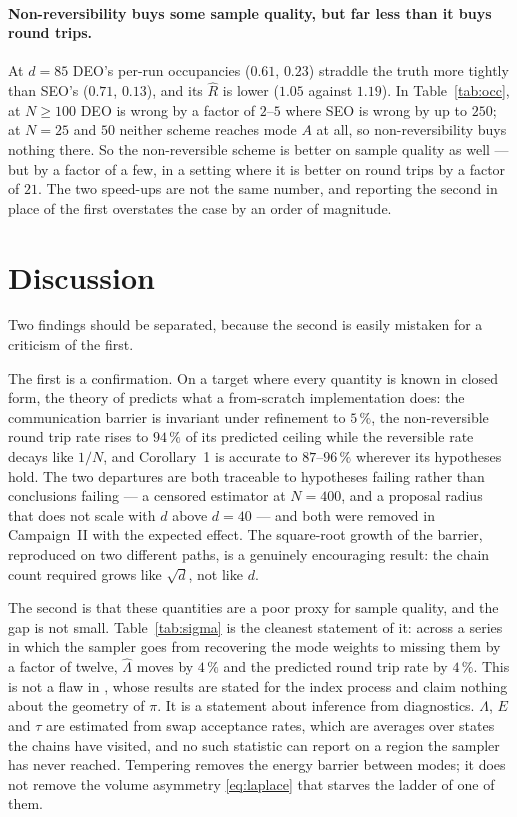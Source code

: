\paragraph{Non-reversibility buys some sample quality, but far less than it buys
round trips.} At $d=85$ DEO's per-run occupancies ($0.61$, $0.23$) straddle the
truth more tightly than SEO's ($0.71$, $0.13$), and its $\hat R$ is lower
($1.05$ against $1.19$). In Table~\ref{tab:occ}, at $N\ge100$ DEO is wrong by a factor of $2$--$5$ where
SEO is wrong by up to $250$; at $N=25$ and $50$ neither scheme reaches mode $A$
at all, so non-reversibility buys nothing there. So the non-reversible scheme is
better on sample quality as well --- but by a factor of a few, in a setting where
it is better on round trips by a factor of $21$. The two speed-ups are not the
same number, and reporting the second in place of the first overstates the case
by an order of magnitude.


\section{Discussion}
\label{sec:discussion}

Two findings should be separated, because the second is easily mistaken for a
criticism of the first.

The first is a confirmation. On a target where every quantity is known in closed
form, the theory of \citet{syed2022} predicts what a from-scratch implementation
does: the communication barrier is invariant under refinement to $5\,\%$, the
non-reversible round trip rate rises to $94\,\%$ of its predicted ceiling while
the reversible rate decays like $1/N$, and Corollary~1 is accurate to
$87$--$96\,\%$ wherever its hypotheses hold. The two departures are both traceable
to hypotheses failing rather than conclusions failing --- a censored estimator at
$N=400$, and a proposal radius that does not scale with $d$ above $d=40$ --- and
both were removed in Campaign~II with the expected effect. The square-root growth
of the barrier, reproduced on two different paths, is a genuinely encouraging
result: the chain count required grows like $\sqrt d$, not like $d$.

The second is that these quantities are a poor proxy for sample quality, and the
gap is not small. Table~\ref{tab:sigma} is the cleanest statement of it: across a
series in which the sampler goes from recovering the mode weights to missing them
by a factor of twelve, $\hat\Lambda$ moves by $4\,\%$ and the predicted round trip
rate by $4\,\%$. This is not a flaw in \citet{syed2022}, whose results are stated
for the index process and claim nothing about the geometry of $\pi$. It is a
statement about inference from diagnostics. $\Lambda$, $E$ and $\tau$ are
estimated from swap acceptance rates, which are averages over states the chains
have visited, and no such statistic can report on a region the sampler has never
reached. Tempering removes the energy barrier between modes; it does not remove
the volume asymmetry \eqref{eq:laplace} that starves the ladder of one of them.

